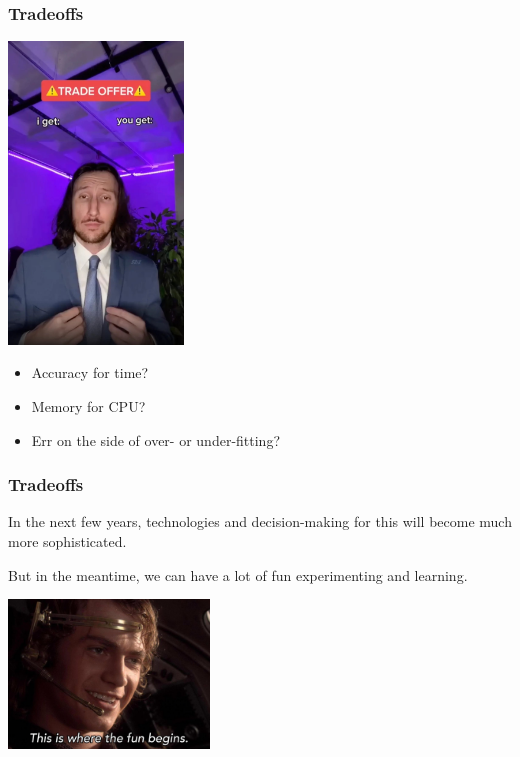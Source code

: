 \begin{frame}
\frametitle{Tradeoffs}
\begin{multicols}{2}
\includegraphics[width=0.35\textwidth]{images/tradeoffer.jpg}
\columnbreak
\begin{itemize}
\item Accuracy for time? \\[5em]

\item Memory for CPU? \\[5em]

\item Err on the side of over- or under-fitting?
\end{itemize}
\end{multicols}

\end{frame}

\begin{frame}
\frametitle{Tradeoffs}

In the next few years, technologies and decision-making for this will become much more sophisticated.

But in the meantime, we can have a lot of fun experimenting and learning.
\begin{center}
	\includegraphics[width=0.4\textwidth]{images/funbegins.jpg}
\end{center}




\end{frame}



